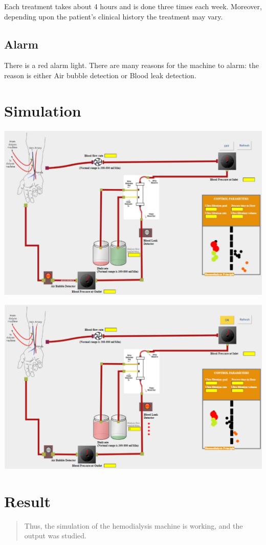 \documentclass[
  11pt,
  letterpaper,
  DIV=11,
  numbers=noendperiod]{scrreprt}
\begin{document}
Each treatment takes about 4 hours and is done three times each week.
Moreover, depending upon the patient's clinical history the treatment
may vary.

\subsection{Alarm}\label{alarm}

There is a red alarm light. There are many reasons for the machine to
alarm: the reason is either Air bubble detection or Blood leak
detection.

\section{Simulation}\label{simulation-3}

\includegraphics[width=6.04167in,height=\textheight]{images/clipboard-2890244601.png}

\includegraphics[width=6.01042in,height=\textheight]{images/clipboard-3169178804.png}

\section{Result}\label{result-8}

\begin{quote}
Thus, the simulation of the hemodialysis machine is working, and the
output was studied.
\end{quote}
\end{document}

